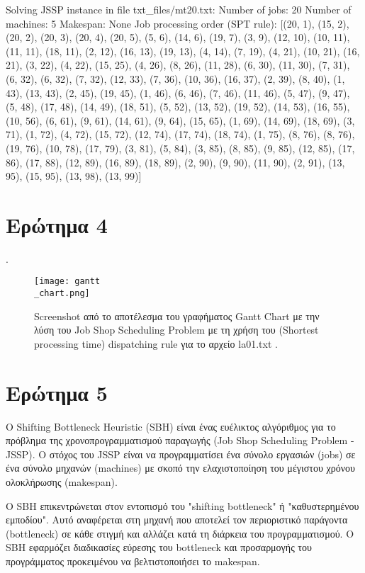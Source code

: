 \documentclass[paper=a4, fontsize=11pt]{scrartcl}
\numberwithin{equation}{section}		%
\numberwithin{figure}{section}			%
\numberwithin{table}{section}				%
\begin{document}
Solving JSSP instance in file txt\_files/mt20.txt:
Number of jobs: 20
Number of machines: 5
Makespan: None
Job processing order (SPT rule): [(20, 1), (15, 2), (20, 2), (20, 3), (20, 4), (20, 5), (5, 6), (14, 6), (19, 7), (3, 9), (12, 10), (10, 11), (11, 11), (18, 11), (2, 12), (16, 13), (19, 13), (4, 14), (7, 19), (4, 21), (10, 21), (16, 21), (3, 22), (4, 22), (15, 25), (4, 26), (8, 26), (11, 28), (6, 30), (11, 30), (7, 31), (6, 32), (6, 32), (7, 32), (12, 33), (7, 36), (10, 36), (16, 37), (2, 39), (8, 40), (1, 43), (13, 43), (2, 45), (19, 45), (1, 46), (6, 46), (7, 46), (11, 46), (5, 47), (9, 47), (5, 48), (17, 48), (14, 49), (18, 51), (5, 52), (13, 52), (19, 52), (14, 53), (16, 55), (10, 56), (6, 61), (9, 61), (14, 61), (9, 64), (15, 65), (1, 69), (14, 69), (18, 69), (3, 71), (1, 72), (4, 72), (15, 72), (12, 74), (17, 74), (18, 74), (1, 75), (8, 76), (8, 76), (19, 76), (10, 78), (17, 79), (3, 81), (5, 84), (3, 85), (8, 85), (9, 85), (12, 85), (17, 86), (17, 88), (12, 89), (16, 89), (18, 89), (2, 90), (9, 90), (11, 90), (2, 91), (13, 95), (15, 95), (13, 98), (13, 99)]



\section*{Ερώτημα 4} 
.\\
\begin{figure}[htbp]
\centerline{\texttt{[image: gantt\\\_chart.png]}}
\caption{Screenshot από το αποτέλεσμα του γραφήματος Gantt Chart με την λύση του Job Shop Scheduling Problem με τη χρήση του (Shortest processing time) dispatching rule για το αρχείο la01.txt .}
\label{fig}
\end{figure}


\section*{Ερώτημα 5}
Ο Shifting Bottleneck Heuristic (SBH) είναι ένας ευέλικτος αλγόριθμος για το πρόβλημα της χρονοπρογραμματισμού παραγωγής (Job Shop Scheduling Problem - JSSP). Ο στόχος του JSSP είναι να προγραμματίσει ένα σύνολο εργασιών (jobs) σε ένα σύνολο μηχανών (machines) με σκοπό την ελαχιστοποίηση του μέγιστου χρόνου ολοκλήρωσης (makespan).

Ο SBH επικεντρώνεται στον εντοπισμό του "shifting bottleneck" ή "καθυστερημένου εμποδίου". Αυτό αναφέρεται στη μηχανή που αποτελεί τον περιοριστικό παράγοντα (bottleneck) σε κάθε στιγμή και αλλάζει κατά τη διάρκεια του προγραμματισμού. Ο SBH εφαρμόζει διαδικασίες εύρεσης του bottleneck και προσαρμογής του προγράμματος προκειμένου να βελτιστοποιήσει το makespan.
\end{document}
